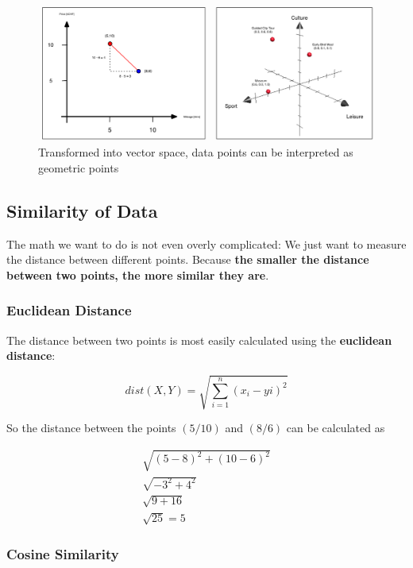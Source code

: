 \documentclass[a4paper, 11pt]{article}
\begin{document}
\begin{figure}[htb!]
    \centering
    \includegraphics[keepaspectratio=true, width=\linewidth]{geometric_interpretation.png}
    \caption{Transformed into vector space, data points can be interpreted as geometric points}
    \label{fig:geometric_intepretation}
\end{figure}

\newpage

\subsection{Similarity of Data}

The math we want to do is not even overly complicated: We just want to measure the distance between different points. Because \textbf{the smaller the distance between two points, the more similar they are}. 

\subsubsection{Euclidean Distance}

The distance between two points is most easily calculated using the \textbf{euclidean distance}:

\begin{equation}
	dist(X,Y)= \sqrt{\sum^{n}_{i=1}(x_{i}-y{i})^2} 
\end{equation}

So the distance between the points $(5/10)$ and $(8/6)$ can be calculated as

\begin{align}
    \sqrt{(5-8)^2 + (10-6)^2} \\
    \sqrt{-3^2 + 4^2} \\
    \sqrt{9+16} \\ 
    \sqrt{25} = 5
\end{align}

\newpage

\subsubsection{Cosine Similarity}
\end{document}
